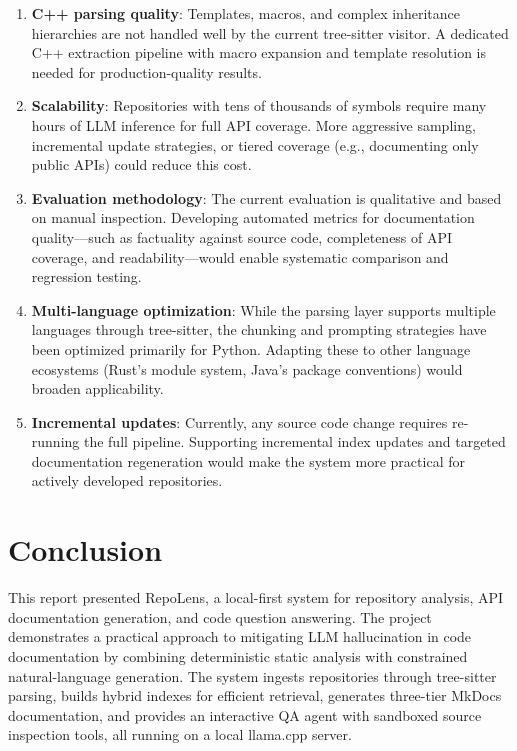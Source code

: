 \documentclass[10pt,twocolumn]{article}
\begin{document}
\begin{enumerate}[nosep,leftmargin=*]
  \item \textbf{C++ parsing quality}: Templates, macros, and complex inheritance hierarchies are not handled well by the current tree-sitter visitor. A dedicated C++ extraction pipeline with macro expansion and template resolution is needed for production-quality results.
  \item \textbf{Scalability}: Repositories with tens of thousands of symbols require many hours of LLM inference for full API coverage. More aggressive sampling, incremental update strategies, or tiered coverage (e.g., documenting only public APIs) could reduce this cost.
  \item \textbf{Evaluation methodology}: The current evaluation is qualitative and based on manual inspection. Developing automated metrics for documentation quality---such as factuality against source code, completeness of API coverage, and readability---would enable systematic comparison and regression testing.
  \item \textbf{Multi-language optimization}: While the parsing layer supports multiple languages through tree-sitter, the chunking and prompting strategies have been optimized primarily for Python. Adapting these to other language ecosystems (Rust's module system, Java's package conventions) would broaden applicability.
  \item \textbf{Incremental updates}: Currently, any source code change requires re-running the full pipeline. Supporting incremental index updates and targeted documentation regeneration would make the system more practical for actively developed repositories.
\end{enumerate}

\section{Conclusion}

This report presented RepoLens, a local-first system for repository analysis, API documentation generation, and code question answering. The project demonstrates a practical approach to mitigating LLM hallucination in code documentation by combining deterministic static analysis with constrained natural-language generation. The system ingests repositories through tree-sitter parsing, builds hybrid indexes for efficient retrieval, generates three-tier MkDocs documentation, and provides an interactive QA agent with sandboxed source inspection tools, all running on a local llama.cpp server.
\end{document}
